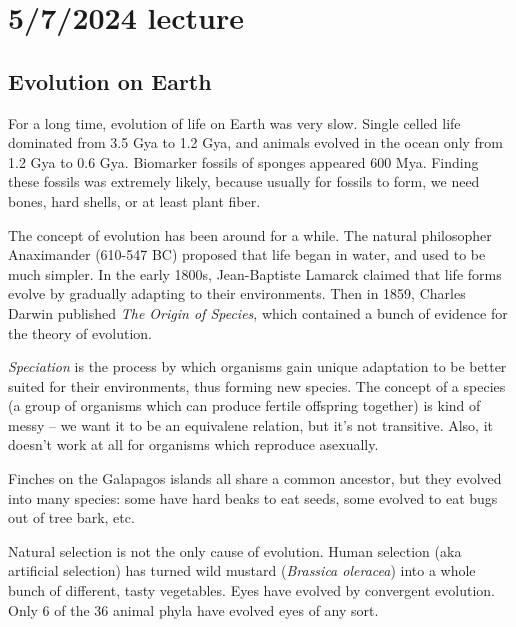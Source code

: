 \documentclass[class=article, crop=false]{standalone}
\begin{document}
\section{5/7/2024 lecture}
\subsection{Evolution on Earth}
For a long time, evolution of life on Earth was very slow. Single celled life dominated from 3.5 Gya to 1.2 Gya, and animals evolved in the ocean only from 1.2 Gya to 0.6 Gya. Biomarker fossils of sponges appeared 600 Mya. Finding these fossils was extremely likely, because usually for fossils to form, we need bones, hard shells, or at least plant fiber.
\par
The concept of evolution has been around for a while. The natural philosopher Anaximander (610-547 BC) proposed that life began in water, and used to be much simpler. In the early 1800s, Jean-Baptiste Lamarck claimed that life forms evolve by gradually adapting to their environments. Then in 1859, Charles Darwin published \textit{The Origin of Species}, which contained a bunch of evidence for the theory of evolution.
\par
\textit{Speciation} is the process by which organisms gain unique adaptation to be better suited for their environments, thus forming new species. The concept of a species (a group of organisms which can produce fertile offspring together) is kind of messy -- we want it to be an equivalene relation, but it's not transitive. Also, it doesn't work at all for organisms which reproduce asexually.
\par
Finches on the Galapagos islands all share a common ancestor, but they evolved into many species: some have hard beaks to eat seeds, some evolved to eat bugs out of tree bark, etc.
\par
Natural selection is not the only cause of evolution. Human selection (aka artificial selection) has turned wild mustard (\textit{Brassica oleracea}) into a whole bunch of different, tasty vegetables.
Eyes have evolved by convergent evolution. Only 6 of the 36 animal phyla have evolved eyes of any sort.
\end{document}
